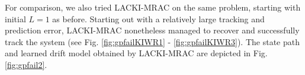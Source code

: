 For comparison, we also tried LACKI-MRAC on the same problem, starting with initial $L=1$ as before. Starting out with a relatively large tracking and prediction error, LACKI-MRAC nonetheless managed to recover and successfully track the system (see  Fig.  \ref{fig:gpfailKIWR1} -  \ref{fig:gpfailKIWR3}). The state path and learned drift model obtained by LACKI-MRAC are depicted in Fig. \ref{fig:gpfail2}.
%
\begin{figure*}
        \centering
   \caption{Depicted are the state path and the drift model learned online byLACKI-MRAC.}
	\label{fig:gpfail2}
\end{figure*}	 